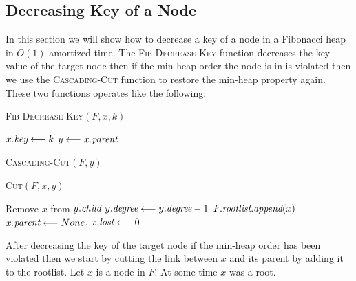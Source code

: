 \subsection{Decreasing Key of a Node}
In this section we will show how to decrease a key of a node in a Fibonacci heap in $O(1)$ amortized time. The \textsc{Fib-Decrease-Key} function decreases the key value of the target node then if the min-heap order the node is in is violated then we use the \textsc{Cascading-Cut} function to restore the min-heap property again. These two functions operates like the following:
\begin{center}
	\begin{minipage}{0.45\textwidth}
		\begin{algorithm}[H]
			\caption{\textsc{Fib-Decrease-Key}$(F,x,k)$}
			\DontPrintSemicolon
			$x.\emph{key}\longleftarrow k$\;
			$y\longleftarrow x.\emph{parent}$\;
		\end{algorithm}
	\end{minipage}\hfill
	\begin{minipage}{0.45\textwidth}
		\begin{algorithm}[H]
			\caption{\textsc{Cascading-Cut}$(F,y)$}
			\DontPrintSemicolon
		\end{algorithm}
		\begin{algorithm}[H]
			\caption{\textsc{Cut}$(F,x,y)$}
			\DontPrintSemicolon
			Remove $x$ from $y.\emph{child}$\;
			$y.\emph{degree}\longleftarrow y.\emph{degree}-1$\;
			$F.\emph{rootlist}.\emph{append}(x)$\;
			$x.\emph{parent}\longleftarrow None$, $x.\emph{lost}\longleftarrow 0$\;
		\end{algorithm}
	\end{minipage}
\end{center}
After decreasing the key of the target node if the min-heap order has been violated then we start by cutting the link between $x$ and its parent by adding it to the rootlist. Let $x$ is a node in $F$. At some time $x$ was a root. 
